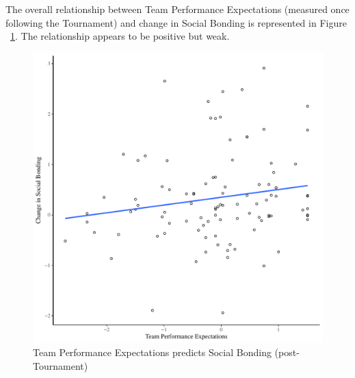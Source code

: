 The overall relationship between Team Performance Expectations (measured once following the Tournament) and change in Social Bonding is represented in Figure ~\ref{fig:teamPerfBondDeltaBasicXY}.  The relationship appears to be positive but weak.

    \begin{figure}[htbp]
      \centering
    \includegraphics[scale=.5]{images/teamPerfBondDeltaBasicXY.pdf}
      \caption{Team Performance Expectations predicts Social Bonding (post-Tournament)}
      \label{fig:teamPerfBondDeltaBasicXY}
    \end{figure}

